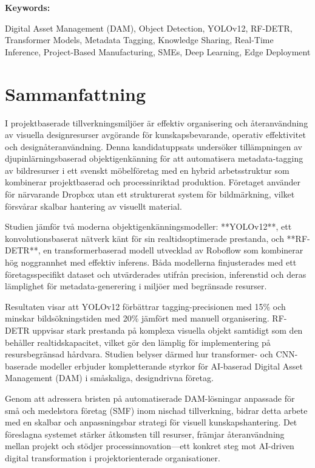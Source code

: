 \documentclass[a4paper,10pt,twocolumn]{article}
\numberwithin{figure}{section}
\numberwithin{table}{section}
\begin{document}
\vspace{0.3cm} 
\textbf{Keywords:} 
    
Digital Asset Management (DAM), Object Detection, YOLOv12, RF-DETR, 
Transformer Models, Metadata Tagging, Knowledge Sharing, Real-Time Inference, 
Project-Based Manufacturing, SMEs, Deep Learning, Edge Deployment

\newpage
{} 
\section*{Sammanfattning}

I projektbaserade tillverkningsmiljöer är effektiv organisering och återanvändning av visuella designresurser avgörande för kunskapsbevarande, operativ effektivitet och designåteranvändning. Denna kandidatuppsats undersöker tillämpningen av djupinlärningsbaserad objektigenkänning för att automatisera metadata-tagging av bildresurser i ett svenskt möbelföretag med en hybrid arbetsstruktur som kombinerar projektbaserad och processinriktad produktion. Företaget använder för närvarande Dropbox utan ett strukturerat system för bildmärkning, vilket försvårar skalbar hantering av visuellt material.

Studien jämför två moderna objektigenkänningsmodeller: **YOLOv12**, ett konvolutionsbaserat nätverk känt för sin realtidsoptimerade prestanda, och **RF-DETR**, en transformerbaserad modell utvecklad av Roboflow som kombinerar hög noggrannhet med effektiv inferens. Båda modellerna finjusterades med ett företagsspecifikt dataset och utvärderades utifrån precision, inferenstid och deras lämplighet för metadata-generering i miljöer med begränsade resurser.

Resultaten visar att YOLOv12 förbättrar tagging-precisionen med 15\% och minskar bildsökningstiden med 20\% jämfört med manuell organisering. RF-DETR uppvisar stark prestanda på komplexa visuella objekt samtidigt som den behåller realtidskapacitet, vilket gör den lämplig för implementering på resursbegränsad hårdvara. Studien belyser därmed hur transformer- och CNN-baserade modeller erbjuder kompletterande styrkor för AI-baserad Digital Asset Management (DAM) i småskaliga, designdrivna företag.

Genom att adressera bristen på automatiserade DAM-lösningar anpassade för små och medelstora företag (SMF) inom nischad tillverkning, bidrar detta arbete med en skalbar och anpassningsbar strategi för visuell kunskapshantering. Det föreslagna systemet stärker åtkomsten till resurser, främjar återanvändning mellan projekt och stödjer processinnovation—ett konkret steg mot AI-driven digital transformation i projektorienterade organisationer.
\end{document}

